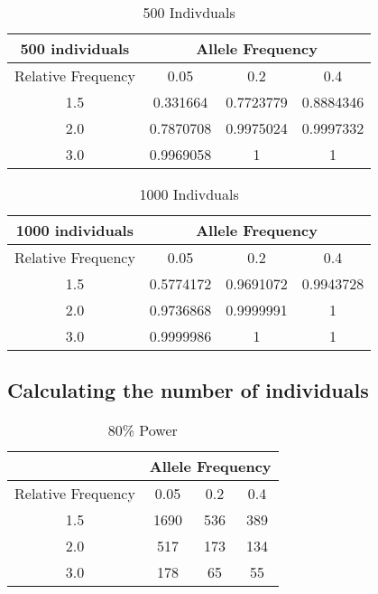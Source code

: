 \documentclass{article}
\begin{document}
\begin{table}[H]
	\centering
	\begin{tabular}{| c | c | c | c |}
		\hline
		500 individuals & \multicolumn{3}{|c|}{Allele Frequency} \\
		\hline
		Relative Frequency & 0.05 & 0.2 & 0.4 \\
		\hline
		1.5 & 0.331664 & 0.7723779 & 0.8884346 \\
		\cline{2-4}
		2.0 & 0.7870708 & 0.9975024 & 0.9997332 \\
		\cline{2-4}
		3.0 & 0.9969058 & 1 & 1 \\
		\hline
	\end{tabular}
	\caption{500 Indivduals}
\end{table}

\begin{table}[H]
	\centering
	\begin{tabular}{| c | c | c | c |}
		\hline
		1000 individuals & \multicolumn{3}{|c|}{Allele Frequency} \\
		\hline
		Relative Frequency & 0.05 & 0.2 & 0.4 \\
		\hline
		1.5 & 0.5774172 & 0.9691072 & 0.9943728 \\
		\cline{2-4}
		2.0 & 0.9736868 & 0.9999991 & 1 \\
		\cline{2-4}
		3.0 & 0.9999986 & 1 & 1 \\
		\hline
	\end{tabular}
	\caption{1000 Indivduals}
\end{table}

\subsection{Calculating the number of individuals}

\begin{table}[H]
	\centering
	\begin{tabular}{| c | c | c | c |}
		\hline
		& \multicolumn{3}{|c|}{Allele Frequency} \\
		\hline
		Relative Frequency & 0.05 & 0.2 & 0.4 \\
		\hline
		1.5 & 1690 & 536 & 389 \\
		\cline{2-4}
		2.0 & 517 & 173 & 134 \\
		\cline{2-4}
		3.0 & 178 & 65 & 55 \\
		\hline
	\end{tabular}
	\caption{80\% Power}
\end{table}
\end{document}
